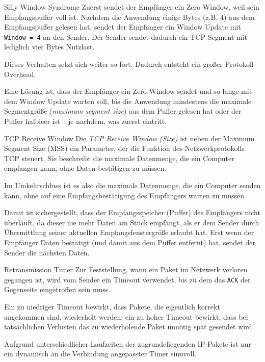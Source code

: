 \begin{bonus}{Silly Window Syndrome}
    Zuerst sendet der Empfänger ein Zero Window, weil sein Empfangspuffer voll ist.
    Nachdem die Anwendung einige Bytes (z.B. 4) aus dem Empfangspuffer gelesen hat, sendet der Empfänger ein Window Update mit \texttt{Window = 4} an den Sender.
    Der Sender sendet dadurch ein TCP-Segment mit lediglich vier Bytes Nutzlast.

    Dieses Verhalten setzt sich weiter so fort. Dadurch entsteht ein großer Protokoll-Overhead.

    Eine Lösung ist, dass der Empfänger ein Zero Window sendet und so lange mit dem Window Update warten soll, bis die Anwendung mindestens die maximale Segmentgröße (\emph{maximum segment size}) aus dem Puffer gelesen hat oder der Puffer halbleer ist – je nachdem, was zuerst eintritt.
\end{bonus}

\begin{defi}{TCP Receive Window}
    Die \emph{TCP Receive Window (Size)} ist neben der Maximum Segment Size (MSS) ein Parameter, der die Funktion des Netzwerkprotokolls TCP steuert.
    Sie beschreibt die maximale Datenmenge, die ein Computer empfangen kann, ohne Daten bestätigen zu müssen.

    Im Umkehrschluss ist es also die maximale Datenmenge, die ein Computer senden kann, ohne auf eine Empfangsbestätigung des Empfängers warten zu müssen.

    Damit ist sichergestellt, dass der Empfangsspeicher (Puffer) des Empfängers nicht überläuft, da dieser nie mehr Daten am Stück empfängt, als er dem Sender durch Übermittlung seiner aktuellen Empfangsfenstergröße erlaubt hat.
    Erst wenn der Empfänger Daten bestätigt (und damit aus dem Puffer entfernt) hat, sendet der Sender die nächsten Daten.
\end{defi}

\begin{bonus}{Retransmission Timer}
    Zur Feststellung, wann ein Paket im Netzwerk verloren gegangen ist, wird vom Sender ein Timeout verwendet, bis zu dem das \texttt{ACK} der Gegenseite eingetroffen sein muss.

    Ein zu niedriger Timeout bewirkt, dass Pakete, die eigentlich korrekt angekommen sind, wiederholt werden; ein zu hoher Timeout bewirkt, dass bei tatsächlichen Verlusten das zu wiederholende Paket unnötig spät gesendet wird.

    Aufgrund unterschiedlicher Laufzeiten der zugrundeliegenden IP-Pakete ist nur ein dynamisch an die Verbindung angepasster Timer sinnvoll.
\end{bonus}